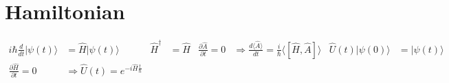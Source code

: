 \documentclass{article}
\newcommand{\mysection}[1]{\vspace{-2em}
\section*{#1}
\vspace{-2em}}
\newcommand{\ket}[1]{\ensuremath{\mid#1\rangle}}
\newcommand{\expect}[1]{\ensuremath{\langle#1\rangle}}
\newcommand{\op}[1]{\ensuremath{\hat#1}}
\newcommand{\opt}[1]{\tp{\op{#1}}}
\newcommand{\tp}[1]{\ensuremath{#1^\dagger}}
\begin{document}
	\mysection{Hamiltonian}
	\begin{align*}
		i\hbar\frac{d}{dt}\ket{\psi(t)}&=\op{H}\ket{\psi(t)} &
		\opt{H}&=\op{H} &
		\frac{\partial\op{A}}{\partial t}=0&\Rightarrow
			\frac{d\expect{\op{A}}}{dt}=
			\frac{i}{\hbar}\expect{[\op{H},\op{A}]} &
		\op{U(t)}\ket{\psi(0)}&=\ket{\psi(t)} \\
		\frac{\partial\op{H}}{\partial t}=0&\Rightarrow
			\op{U(t)}=e^{-i\op{H}\frac{t}{\hbar}}
	\end{align*}
\end{document}
